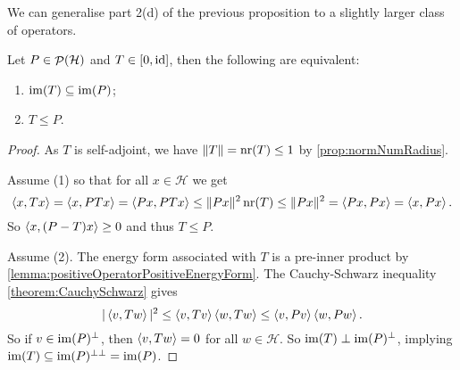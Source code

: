We can generalise part 2(d) of the previous proposition to a slightly larger class of operators.
\begin{lemma} \label{lemma:comparisonSelfAdjointProjection}
Let $P\in \mathop{\mathcal{P}}\nolimits(\mathcal{H})$ and $T \in [0,\operatorname{id}]$, then the following are equivalent:
\begin{enumerate}
\item $\operatorname{im}(T) \subseteq \operatorname{im}(P)$;
\item $T\leq P$.
\end{enumerate}
\end{lemma}
\begin{proof}
As $T$ is self-adjoint, we have $\lVert T\rVert = \operatorname{nr}(T) \leq 1$ by \ref{prop:normNumRadius}.

Assume (1) so that for all $x\in \mathcal{H}$ we get
\[ \left\langle x,Tx \right\rangle = \left\langle x, PTx \right\rangle = \left\langle Px,PTx \right\rangle \leq \lVert Px\rVert^2\operatorname{nr}(T) \leq \lVert Px\rVert^2 = \left\langle Px,Px \right\rangle = \left\langle x,Px \right\rangle. \]
So $\left\langle x, (P-T)x \right\rangle\geq 0$ and thus $T\leq P$.

Assume (2). The energy form associated with $T$ is a pre-inner product by \ref{lemma:positiveOperatorPositiveEnergyForm}. The Cauchy-Schwarz inequality \ref{theorem:CauchySchwarz} gives
\[ |\left\langle v,Tw \right\rangle|^2 \leq \left\langle v,Tv \right\rangle\left\langle w,Tw \right\rangle \leq \left\langle v,Pv \right\rangle\left\langle w,Pw \right\rangle. \]
So if $v\in\operatorname{im}(P)^\perp$, then $\left\langle v,Tw \right\rangle = 0$ for all $w\in \mathcal{H}$. So $\operatorname{im}(T)\perp \operatorname{im}(P)^\perp$, implying $\operatorname{im}(T)\subseteq \operatorname{im}(P)^{\perp\perp} = \operatorname{im}(P)$.
\end{proof}

